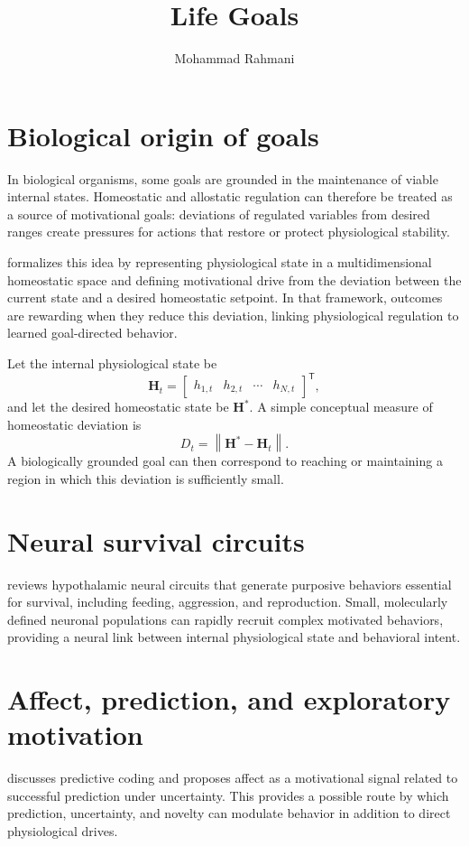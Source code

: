 \documentclass[a4paper]{article}
\title{Life Goals}
\date{}
\author{Mohammad Rahmani}
\begin{document}
   \maketitle

   \section{Biological origin of goals}
      In biological organisms, some goals are grounded in the maintenance of viable internal states. Homeostatic and allostatic regulation can therefore be treated as a source of motivational goals: deviations of regulated variables from desired ranges create pressures for actions that restore or protect physiological stability.

      \cite{keramati-2014-homeostatic-reinforcement-learning} formalizes this idea by representing physiological state in a multidimensional homeostatic space and defining motivational drive from the deviation between the current state and a desired homeostatic setpoint. In that framework, outcomes are rewarding when they reduce this deviation, linking physiological regulation to learned goal-directed behavior.

      Let the internal physiological state be
      \[
         \mathbf{H}_t =
         \begin{bmatrix}
            h_{1,t} & h_{2,t} & \cdots & h_{N,t}
         \end{bmatrix}^{\mathsf T},
      \]
      and let the desired homeostatic state be \(\mathbf{H}^{*}\). A simple conceptual measure of homeostatic deviation is
      \[
         D_t = \left\|\mathbf{H}^{*}-\mathbf{H}_t\right\|.
      \]
      A biologically grounded goal can then correspond to reaching or maintaining a region in which this deviation is sufficiently small.

   \section{Neural survival circuits}
      \cite{sternson-2013-hypothalamic-survival-circuits-blueprints-for-purposive-behaviors} reviews hypothalamic neural circuits that generate purposive behaviors essential for survival, including feeding, aggression, and reproduction. Small, molecularly defined neuronal populations can rapidly recruit complex motivated behaviors, providing a neural link between internal physiological state and behavioral intent.

   \section{Affect, prediction, and exploratory motivation}
      \cite{trapp-2017-commentary-on-the-joys-of-perceiving-affect-as-feedback-for-perceptual-predictions} discusses predictive coding and proposes affect as a motivational signal related to successful prediction under uncertainty. This provides a possible route by which prediction, uncertainty, and novelty can modulate behavior in addition to direct physiological drives.
\end{document}
